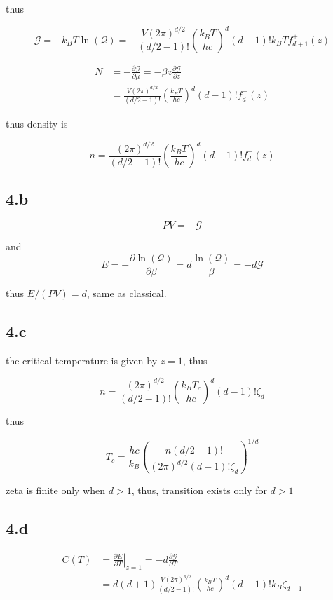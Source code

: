 \documentclass{article}
\begin{document}
thus

$$
\mathcal{G} = -k_B T \ln(\mathcal{Q}) = -\frac{V (2\pi)^{d/2}}{(d/2 - 1)!} (\frac{k_B T}{h c})^d (d-1)! k_B T f_{d+1}^{+}(z)
$$

$$
\begin{aligned}
    N &= -\frac{\partial \mathcal{G}}{\partial \mu} = -\beta z \frac{\partial \mathcal{G}}{\partial z}\\
    &=\frac{V (2\pi)^{d/2}}{(d/2 - 1)!} (\frac{k_B T}{h c})^d (d-1)! f_{d}^{+}(z)
\end{aligned}
$$

thus density is

$$
n = \frac{(2\pi)^{d/2}}{(d/2 - 1)!} (\frac{k_B T}{h c})^d (d-1)! f_{d}^{+}(z)
$$

\subsection*{4.b}

$$
PV = -\mathcal{G}
$$

and
$$
E = -\frac{\partial \ln(\mathcal{Q})}{\partial \beta} = d \frac{\ln(\mathcal{Q})}{\beta} = -d\mathcal{G}
$$

thus $E/(PV) = d$, same as classical.

\subsection*{4.c}

the critical temperature is given by $z=1$, thus

$$
n = \frac{(2\pi)^{d/2}}{(d/2 - 1)!} (\frac{k_B T_c}{h c})^d (d-1)! \zeta_d
$$

thus

$$
T_c = \frac{hc}{k_B} (\frac{n (d/2 - 1)!}{(2\pi)^{d/2} (d-1)! \zeta_d})^{1/d}
$$

zeta is finite only when $d > 1$, thus, transition exists only for $d > 1$

\subsection*{4.d}

$$
\begin{aligned}
    C(T) &= \left.\frac{\partial E}{\partial T} \right|_{z=1} = -d \frac{\partial \mathcal{G}}{\partial T}\\
    &= d(d+1) \frac{V (2\pi)^{d/2}}{(d/2 - 1)!} (\frac{k_B T}{h c})^d (d-1)! k_B \zeta_{d+1}
\end{aligned}
$$
\end{document}
